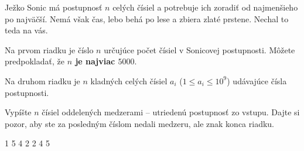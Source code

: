 




Ježko Sonic má postupnosť $n$ celých čísiel a potrebuje ich zoradiť od najmenšieho po najväčší. Nemá
však čas, lebo behá po lese a zbiera zlaté prstene. Nechal to teda na vás.


Na prvom riadku je číslo $n$ určujúce počet čísiel v Sonicovej postupnosti. Môžete predpokladať, že
\textbf{$n$ je najviac $5000$}.

Na druhom riadku je $n$ kladných celých čísiel $a_i$ ($1 \leq a_i \leq 10^9$) udávajúce čísla
postupnosti.


Vypíšte $n$ čísiel oddelených medzerami -- utriedenú postupnosť zo vstupu. Dajte si pozor, aby ste
za posledným číslom nedali medzeru, ale znak konca riadku.


1 5 4 2
 2 4 5
\koniec



